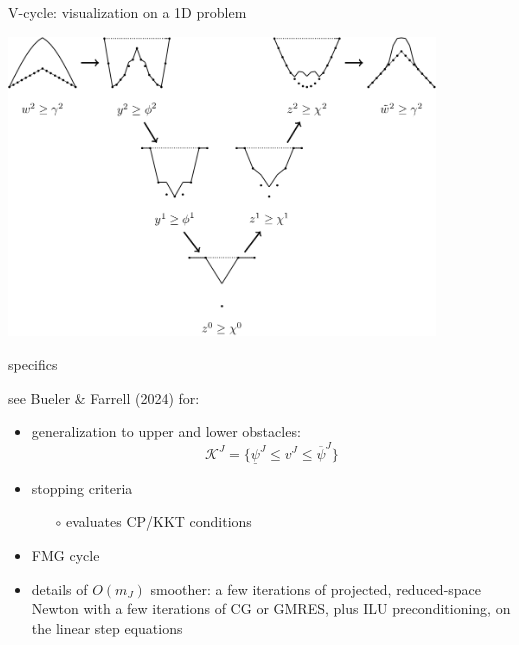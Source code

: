 \documentclass[svgnames,
               hyperref={colorlinks,citecolor=DeepPink4,linkcolor=FireBrick,urlcolor=Maroon},
               usepdftitle=false]  %
               {beamer}
\begin{document}
\begin{frame}{V-cycle: visualization on a 1D problem}

\centering
\includegraphics[width=0.85\textwidth]{../talk-dms/figs/vcycle-visualized.png}
\end{frame}


\begin{frame}{specifics}

see Bueler \& Farrell (2024) for:
\begin{itemize}
\item generalization to upper and lower obstacles:
    $$\mathcal{K}^J = \{\underline{\psi}^J \le v^J \le \overline{\psi}^J\}$$
\item stopping criteria
    \begin{itemize}
    \item[$\circ$] evaluates CP/KKT conditions
    \end{itemize}
\item FMG cycle
\item details of $O(m_J)$ smoother: a few iterations of projected, reduced-space Newton with a few iterations of CG or GMRES, plus ILU preconditioning, on the linear step equations
\end{itemize}
\end{frame}
\end{document}
